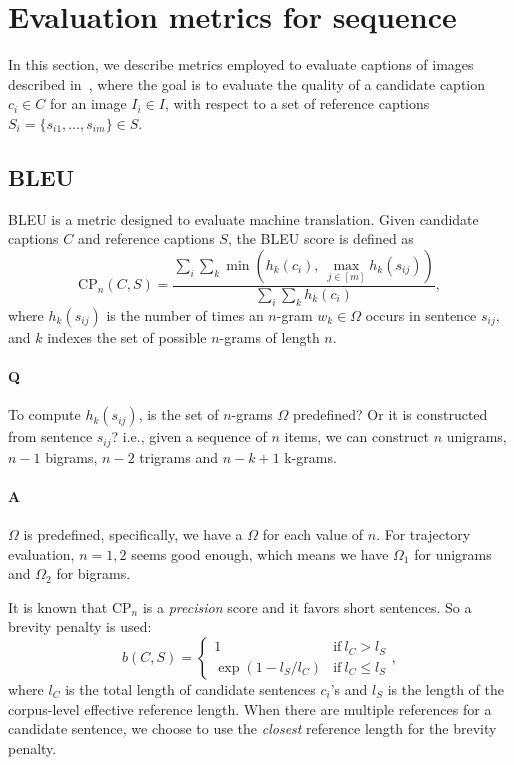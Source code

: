 \section{Evaluation metrics for sequence}

In this section, we describe metrics employed to evaluate captions of images described in~\cite{chen2015microsoft},
where the goal is to evaluate the quality of a candidate caption $c_i \in C$ for an image $I_i \in I$, 
with respect to a set of reference captions $S_i = \{s_{i1},\dots,s_{im}\} \in S$.

\subsection{BLEU}
BLEU is a metric designed to evaluate machine translation.
Given candidate captions $C$ and reference captions $S$, the BLEU score is defined as
\begin{equation*}
\text{CP}_n(C, S) =
\frac{\sum_i \sum_k \min\left( h_k(c_i),~ \max_{j \in [m]} h_k(s_{ij}) \right)}
     {\sum_i \sum_k h_k(c_i)},
\end{equation*}
where $h_k(s_{ij})$ is the number of times an $n$-gram $w_k \in \Omega$ occurs in sentence $s_{ij}$,
and $k$ indexes the set of possible $n$-grams of length $n$.

{\it 
\paragraph{Q} 
To compute $h_k(s_{ij})$, is the set of $n$-grams $\Omega$ predefined? Or it is constructed from sentence $s_{ij}$?
i.e., given a sequence of $n$ items, we can construct $n$ unigrams, $n-1$ bigrams, $n-2$ trigrams and $n-k+1$ k-grams.

\paragraph{A}
$\Omega$ is predefined, specifically, we have a $\Omega$ for each value of $n$. 
For trajectory evaluation, $n=1,2$ seems good enough, which means we have $\Omega_1$ for unigrams and $\Omega_2$ for bigrams. \\
}

\noindent
It is known that CP$_n$ is a \emph{precision} score and it favors short sentences.
So a brevity penalty is used:
\begin{equation*}
b(C, S) = \begin{cases}
1 & \text{if}~ l_C > l_S \\
\exp(1-l_S/l_C) & \text{if}~ l_C \le l_S
\end{cases},
\end{equation*}
where $l_C$ is the total length of candidate sentences $c_i$'s and $l_S$ is the length of the corpus-level effective reference length.
When there are multiple references for a candidate sentence, we choose to use the \textit{closest} reference length for the brevity penalty.


